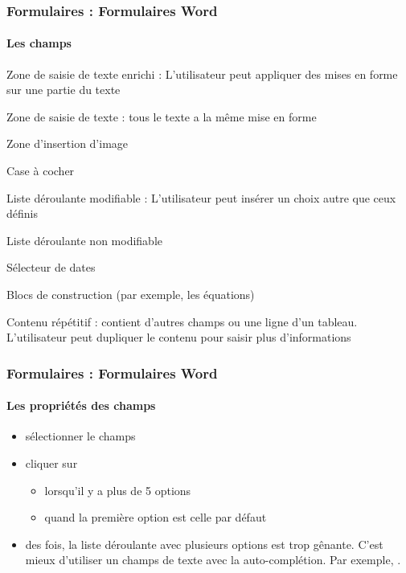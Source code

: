 \documentclass[xcolor=table]{beamer}
\begin{document}
\begin{frame}
\frametitle{Formulaires : Formulaires Word}
\framesubtitle{Les champs}

 Zone de saisie de texte enrichi : L'utilisateur peut appliquer des mises en forme sur une partie du texte

 Zone de saisie de texte : tous le texte a la même mise en forme

 Zone d'insertion d'image

 Case à cocher

 Liste déroulante modifiable : L'utilisateur peut insérer un choix autre que ceux définis

 Liste déroulante non modifiable

 Sélecteur de dates

 Blocs de construction (par exemple, les équations)

 Contenu répétitif : contient d'autres champs ou une ligne d'un tableau. L'utilisateur peut dupliquer le contenu pour saisir plus d'informations

\end{frame}

\begin{frame}
\frametitle{Formulaires : Formulaires Word}
\framesubtitle{Les propriétés des champs}

\begin{minipage}{0.69\textwidth}
	\begin{itemize}
		\item sélectionner le champs
		\item cliquer sur \optword{}
		\begin{itemize}
			\item lorsqu'il y a plus de 5 options 
			\item quand la première option est celle par défaut
		\end{itemize}
		\item des fois, la liste déroulante avec plusieurs options est trop gênante. C'est mieux d'utiliser un champs de texte avec la auto-complétion. Par exemple, .
	\end{itemize}
\end{minipage}
\begin{minipage}{0.30\textwidth}
\end{minipage}

\end{frame}
\end{document}
